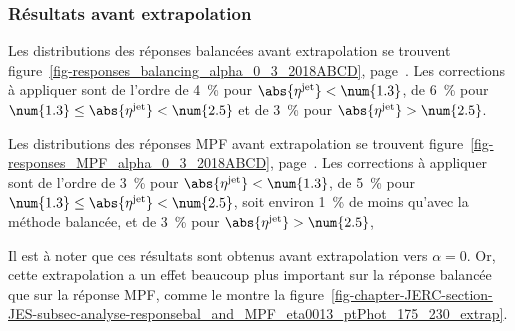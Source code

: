 \subsubsection{Résultats avant extrapolation}\label{chapter-JERC-section-JES-subsec-results-subsubsec-before_extrap}
\par Les distributions des réponses balancées avant extrapolation se trouvent figure~\ref{fig-responses_balancing_alpha_0_3_2018ABCD}, page~\pageref{fig-responses_balancing_alpha_0_3_2018ABCD}.
Les corrections à appliquer sont de l'ordre
de \SI{4}{\%} pour $\abs{\eta^\text{jet}} < \num{1.3}$,
de \SI{6}{\%} pour $\num{1.3} \leq \abs{\eta^\text{jet}} < \num{2.5}$ et
de \SI{3}{\%} pour $\abs{\eta^\text{jet}} > \num{2.5}$.
\par Les distributions des réponses MPF avant extrapolation se trouvent figure~\ref{fig-responses_MPF_alpha_0_3_2018ABCD}, page~\pageref{fig-responses_MPF_alpha_0_3_2018ABCD}.
Les corrections à appliquer sont de l'ordre
de \SI{3}{\%} pour $\abs{\eta^\text{jet}} < \num{1.3}$,
de \SI{5}{\%} pour $\num{1.3} \leq \abs{\eta^\text{jet}} < \num{2.5}$, soit environ \SI{1}{\%} de moins qu'avec la méthode balancée, et
de \SI{3}{\%} pour $\abs{\eta^\text{jet}} > \num{2.5}$,
\par Il est à noter que ces résultats sont obtenus avant extrapolation vers $\alpha=0$. Or, cette extrapolation a un effet beaucoup plus important sur la réponse balancée que sur la réponse MPF, comme le montre la figure~\ref{fig-chapter-JERC-section-JES-subsec-analyse-responsebal_and_MPF_eta0013_ptPhot_175_230_extrap}.
